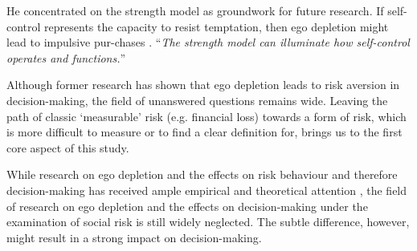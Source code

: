He concentrated on the strength model  as groundwork for future research. If self-control represents the capacity to resist temptation, then ego depletion might lead to impulsive pur-chases \citep{baumeister2002yielding,baumeister2012self}. “\emph{The strength model can illuminate how self-control operates and functions.}” \cite{baumeister2007strength}\par
Although former research has shown that ego depletion leads to risk aversion in decision-making, the field of unanswered questions remains wide. Leaving the path of classic ‘measurable’ risk (e.g. financial loss) towards a form of risk, which is more difficult to measure or to find a clear definition for, brings us to the first core aspect of this study. \par
While research on ego depletion and the effects on risk behaviour and therefore decision-making has received ample empirical and theoretical attention \citep{vohs2008making,vohs2007spent,unger2011ego}, the field of research on ego depletion and the effects on decision-making under the examination of social risk is still widely neglected. The subtle difference, however, might result in a strong impact on decision-making.\par


